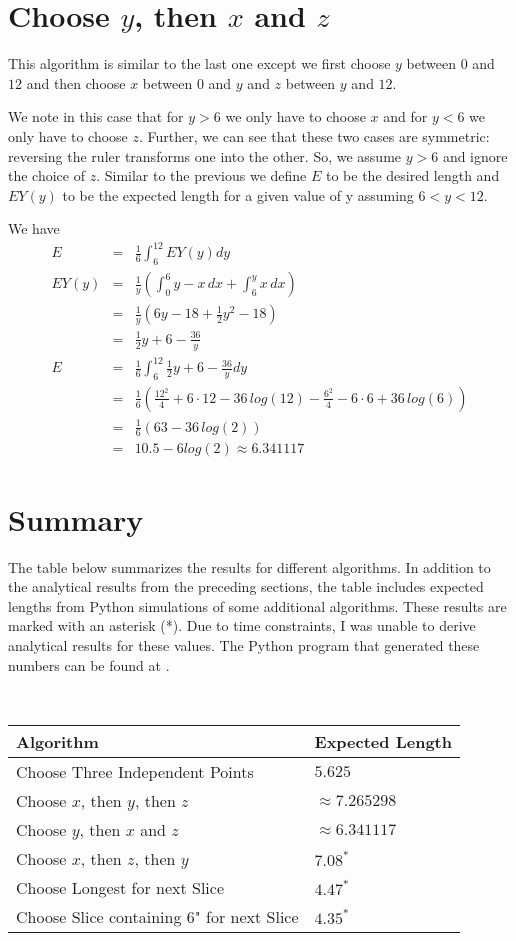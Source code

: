 \documentclass{article}
\begin{document}
\section{Choose $y$, then $x$ and $z$}

This algorithm is similar to the last one except we first choose $y$ between $0$ and $12$ and then choose $x$ between $0$ and $y$ and $z$
between $y$ and $12$.

We note in this case that for $y > 6$ we only have to choose $x$ and for $y < 6$ we only have to choose $z$. Further, we can see that these two
cases are symmetric: reversing the ruler transforms one into the other. So, we assume $y > 6$ and ignore the choice of $z$. Similar to the previous
we define $E$ to be the desired length and $EY(y)$ to be the expected length for a given value of y assuming $6 < y < 12$.

We have
\begin{eqnarray*}
E &=& \frac{1}{6} \int_{6}^{12} EY(y) dy\\
EY(y) &=& \frac{1}{y} \left( \int_{0}^{6} y-x \,dx + \int_{6}^{y} x \, dx \right)\\
&=& \frac{1}{y} \left( 6y - 18 + \frac{1}{2} y^2 - 18 \right)\\
&=& \frac{1}{2}y + 6 - \frac{36}{y}\\
E &=& \frac{1}{6} \int_{6}^{12}  \frac{1}{2}y + 6 - \frac{36}{y} dy\\
&=& \frac{1}{6} \left( \frac{12^2}{4} + 6 \cdot 12 - 36\,log(12) - \frac{6^2}{4} - 6 \cdot 6 + 36\,log(6)\right)\\
&=& \frac{1}{6} \left( 63 - 36 \, log(2) \right)\\
&=& 10.5 - 6 log(2) \approx 6.341117
\end{eqnarray*}

\section{Summary}

The table below summarizes the results for different algorithms. In addition to the analytical results from the preceding sections, the table includes
expected lengths from Python simulations of some additional algorithms. These results are marked with an asterisk (*). Due to time constraints,
I was unable to derive analytical results for these values. The Python program that generated these numbers can be found at \url{}.

\,

\begin{tabular}{l l}
\textbf{Algorithm} & \textbf{Expected Length} \\
\hline Choose Three Independent Points & $5.625$ \\
Choose $x$, then $y$, then $z$ & $\approx 7.265298$\\
Choose $y$, then $x$ and $z$ & $\approx 6.341117$\\
Choose $x$, then $z$, then $y$ & $7.08^*$ \\
Choose Longest for next Slice & $4.47^*$ \\
Choose Slice containing 6" for next Slice & $4.35^*$
\end {tabular}
\end{document}
